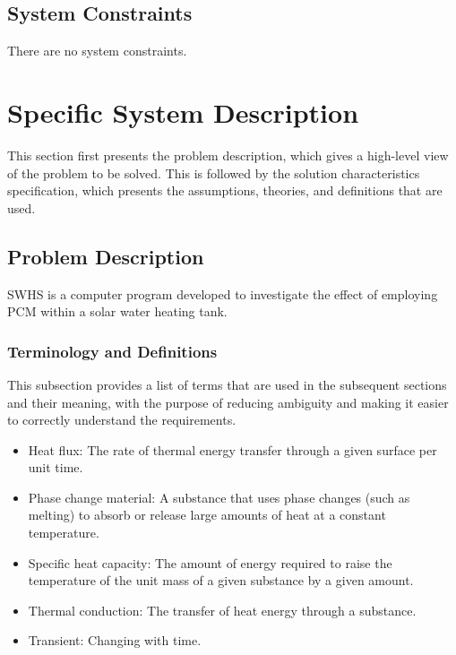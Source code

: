 \documentclass[12pt]{article}
\begin{document}
\subsection{System Constraints}
\label{Sec:SysConstraints}
There are no system constraints.
\section{Specific System Description}
\label{Sec:SpecSystDesc}
This section first presents the problem description, which gives a high-level view of the problem to be solved. This is followed by the solution characteristics specification, which presents the assumptions, theories, and definitions that are used.
\subsection{Problem Description}
\label{Sec:ProbDesc}
SWHS is a computer program developed to investigate the effect of employing PCM within a solar water heating tank.
\subsubsection{Terminology and Definitions}
\label{Sec:TermDefs}
This subsection provides a list of terms that are used in the subsequent sections and their meaning, with the purpose of reducing ambiguity and making it easier to correctly understand the requirements.
\begin{itemize}
\item{Heat flux: The rate of thermal energy transfer through a given surface per unit time.}
\item{Phase change material: A substance that uses phase changes (such as melting) to absorb or release large amounts of heat at a constant temperature.}
\item{Specific heat capacity: The amount of energy required to raise the temperature of the unit mass of a given substance by a given amount.}
\item{Thermal conduction: The transfer of heat energy through a substance.}
\item{Transient: Changing with time.}
\end{itemize}
\end{document}
